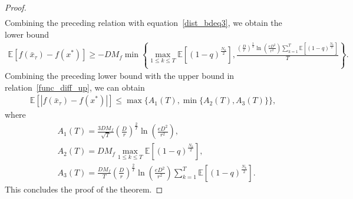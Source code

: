 \documentclass{article}
\newcommand{\EXP}[1]
{\mathbb{E}\!\left[#1\right] }
\theoremstyle{plain}
\theoremstyle{definition}
\theoremstyle{remark}
\begin{document}
\begin{proof}
\begin{align}
\end{align}
Combining the preceding relation with equation~\eqref{dist_bdeq3}, we obtain the lower bound
\begin{align}
    \EXP{f(\bar x_\tau) - f(x^*)} \geq -D M_f \min \left\{ \max_{1 \leq k \leq T} \EXP{(1-q)^{\frac{N_{k}}{2}}},  \frac{\left( \frac{D}{r} \right)^{\frac{2}{T}} \ln \left( \frac{e D^2}{r^2} \right) \sum_{k=1}^T \EXP{(1-q)^{\frac{N_{k}}{2}}}}{T}  \right\} . \nonumber
\end{align}
Combining the preceding lower bound with the upper bound in relation~\eqref{func_diff_up}, we can obtain 
\begin{align*}
    \EXP{|f(\bar x_\tau) - f(x^*)|} \leq \max \{A_1(T), \min \{A_2(T),A_3(T)\}\} ,
\end{align*}
where
\begin{align*}
    &A_1(T) = \frac{3 D M_f}{\sqrt{T}} \left(\frac{D}{r}\right)^{\frac{2}{T}} \ln \left( \frac{e D^2}{r^2} \right), \\
    &A_2(T) = D M_f \max_{1 \leq k \leq T} \EXP{(1-q)^{\frac{N_{k}}{2}}}, \\
    &A_3(T) = \frac{D M_f}{T} \left( \frac{D}{r} \right)^{\frac{2}{T}} \ln \left( \frac{e D^2}{r^2} \right) \sum_{k=1}^T \EXP{(1-q)^{\frac{N_{k}}{2}}}.
\end{align*}
This concludes the proof of the theorem.
\end{proof}
\end{document}
